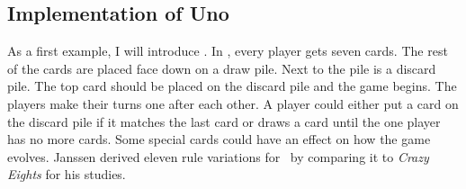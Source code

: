 %
%
%
%

%



\subsection{Implementation of Uno}

As a first example, I will introduce \uno. In \uno, every player gets seven cards. The rest of the cards are placed face down on a draw pile. Next to the pile is a discard pile. The top card should be placed on the discard pile and the game begins. The players make their turns one after each other. A player could either put a card on the discard pile if it matches the last card or draws a card until the one player has no more cards. Some special cards could have an effect on how the game evolves. Janssen derived eleven rule variations for \uno\ by comparing it to \textit{Crazy Eights} for his studies. \cite{janssen2010evolution}

